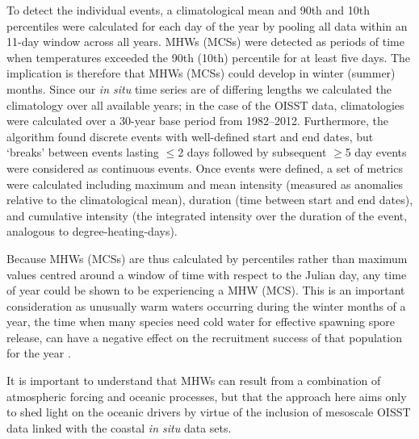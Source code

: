 \documentclass[a4paper,10pt,review]{elsarticle}
\begin{document}
To detect the individual events, a climatological mean and 90th and 10th percentiles were calculated for each day of the year by pooling all data within an 11-day window across all years. MHWs (MCSs) were detected as periods of time when temperatures exceeded the 90th (10th) percentile for at least five days. The implication is therefore that MHWs (MCSs) could develop in winter (summer) months. Since our \emph{in situ} time series are of differing lengths we calculated the climatology over all available years; in the case of the OISST data, climatologies were calculated over a 30-year base period from 1982--2012. Furthermore, the algorithm found discrete events with well-defined start and end dates, but `breaks' between events lasting $\leq$2 days followed by subsequent $\geq$5 day events were considered as continuous events. Once events were defined, a set of metrics were calculated including maximum and mean intensity (measured as anomalies relative to the climatological mean), duration (time between start and end dates), and cumulative intensity (the integrated intensity over the duration of the event, analogous to degree-heating-days).

Because MHWs (MCSs) are thus calculated by percentiles rather than maximum values centred around a window of time with respect to the Julian day, any time of year could be shown to be experiencing a MHW (MCS). This is an important consideration as unusually warm waters occurring during the winter months of a year, the time when many species need cold water for effective spawning spore release, can have a negative effect on the recruitment success of that population for the year \cite{Wernberg2011}.

It is important to understand that MHWs can result from a combination of atmospheric forcing and oceanic processes, but that the approach here aims only to shed light on the oceanic drivers by virtue of the inclusion of mesoscale OISST data linked with the coastal \emph{in situ} data sets.
\end{document}
